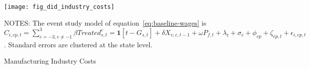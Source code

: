 \begin{figure}[H]
    \centering
    \texttt{[image: fig\_did\_industry\_costs]}
    \caption{Manufacturing Industry Costs}
    \label{fig:baseline-manufacturing-industry-costs}
    \begin{minipage}{18cm}
        \vspace{0.05in}
        NOTES: The event study model of equation~\ref{eq:baseline-wages} is $C_{i,cp,t} = \sum_{{e = -3},{e \neq -1}}^{3} \beta Treated_{s,t}^e = \textbf{1}[t - G_{s,t}] + \delta X_{v,c,t-1} + \omega P_{f,t} + \lambda_{t} + \sigma_{c} + \phi_{cp} + \zeta_{cp,t} + \epsilon_{i,cp,t}$. Standard errors are clustered at the state level.
    \end{minipage}
\end{figure}